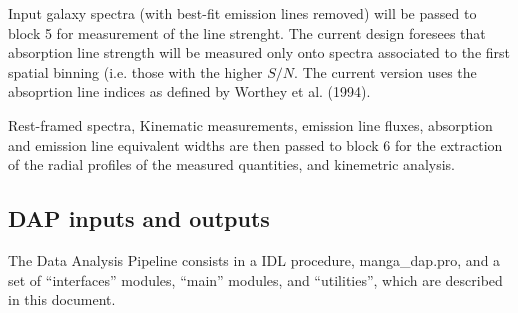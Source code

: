 Input galaxy spectra (with best-fit emission lines removed) will be
passed to block 5 for measurement of the line strenght. The current
design foresees that absorption line strength will be measured only
onto spectra associated to the first spatial binning (i.e. those with
the higher $S/N$. The current version uses the absoprtion line indices
as defined by Worthey et al. (1994).

Rest-framed spectra, Kinematic measurements, emission line fluxes,
absorption and emission line equivalent widths are then passed to
block 6 for the extraction of the radial profiles of the measured
quantities, and kinemetric analysis.

\subsection{DAP inputs and outputs}
\label{dap_sec:dap_inputs_outputs}

The Data Analysis Pipeline consists in a IDL procedure,
manga\_dap.pro, and a set of ``interfaces'' modules, ``main'' modules,
and ``utilities'', which are described in this document.

